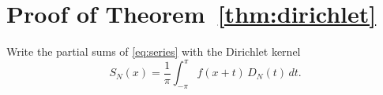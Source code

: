 \section{Proof of Theorem~\ref{thm:dirichlet}}\label{sec:proofs}
Write the partial sums of \eqref{eq:series} with the Dirichlet kernel
\[
  S_N(x) = \frac{1}{\pi}\int_{-\pi}^{\pi} f(x+t)\,D_N(t)\,dt .
\]
